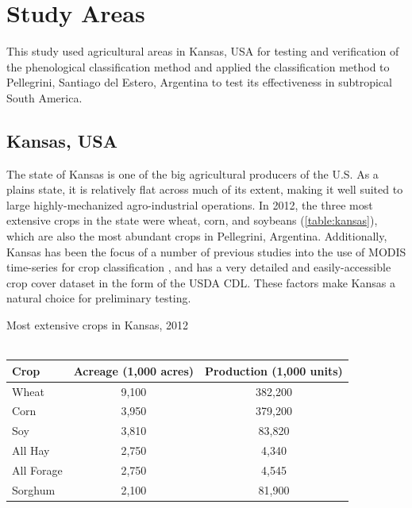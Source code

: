 \chapter{Study Areas}
\label{studyareas}

This study used agricultural areas in Kansas, USA for testing and verification of the phenological classification method and applied the classification method to Pellegrini, Santiago del Estero, Argentina to test its effectiveness in subtropical South America.


\section{Kansas, USA}
\label{studyareas:kansas}

The state of Kansas is one of the big agricultural producers of the U.S. As a plains state, it is relatively flat across much of its extent, making it well suited to large highly-mechanized agro-industrial operations. In 2012, the three most extensive crops in the state were wheat, corn, and soybeans (\autoref{table:kansas}), which are also the most abundant crops in Pellegrini, Argentina. Additionally, Kansas has been the focus of a number of previous studies into the use of MODIS time-series for crop classification \autocites{wardlow2002discriminating}{wardlow2005state-level}{wardlow2007analysis}{wardlow2008large-area}, and has a very detailed and easily-accessible crop cover dataset in the form of the USDA CDL. These factors make Kansas a natural choice for preliminary testing.

\begin{sstable}
  \centering
  \caption[Most extensive crops in Kansas, 2012.]{Most extensive crops in Kansas, 2012\\~\autocite[adapted from][]{usda2013kansascrops}}
  \label{table:kansas}
  \begin{tabu}{lcc}
    \toprule
    \textbf{Crop} & \textbf{Acreage (1,000 acres)} & \textbf{Production (1,000 units)} \\
    \midrule
    Wheat & 9,100 & 382,200 \\
    Corn & 3,950 & 379,200 \\
    Soy & 3,810 & 83,820 \\
    All Hay & 2,750 & 4,340 \\
    All Forage & 2,750 & 4,545 \\
    Sorghum & 2,100 & 81,900 \\      
    \bottomrule
  \end{tabu}
\end{sstable}

